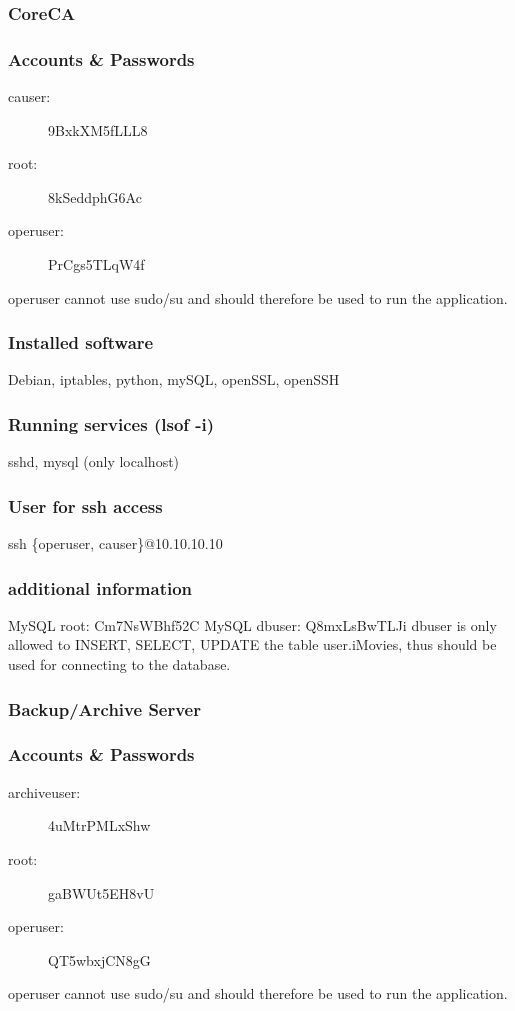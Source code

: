 \documentclass[a4paper, toc=index, 12pt, DIV14, twoside, BCOR2cm, headsepline, numbers=noenddot, bibliography=totoc]{scrbook}
\begin{document}
\subsubsection{CoreCA}
\subsubsection*{Accounts \& Passwords}
\begin{multicols}{2}
\begin{description}
\item[causer:] 9BxkXM5fLLL8
\item[root:] 8kSeddphG6Ac
\item[operuser:] PrCgs5TLqW4f
\end{description}
\end{multicols}
operuser cannot use sudo/su and should therefore be used to run the application.
\subsubsection*{Installed software}
Debian, iptables, python, mySQL, openSSL, openSSH
\subsubsection*{Running services (lsof -i)}
sshd, mysql (only localhost)
\subsubsection*{User for ssh access}
ssh \{operuser, causer\}@10.10.10.10
\subsubsection*{additional information}
MySQL root: Cm7NsWBhf52C\newline
MySQL dbuser: Q8mxLsBwTLJi\newline
dbuser is only allowed to INSERT, SELECT, UPDATE the table user.iMovies, thus should be used for connecting to the database.

\subsubsection{Backup/Archive Server}
\subsubsection*{Accounts \& Passwords}
\begin{multicols}{2}
\begin{description}
\item[archiveuser:] 4uMtrPMLxShw
\item[root:] gaBWUt5EH8vU
\item[operuser:] QT5wbxjCN8gG
\end{description}
\end{multicols}
operuser cannot use sudo/su and should therefore be used to run the application.
\end{document}
